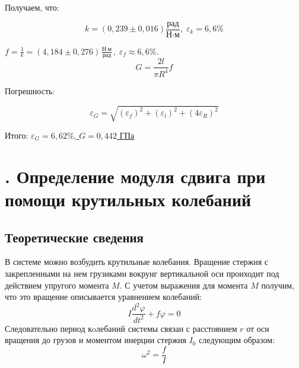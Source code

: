 \documentclass[a4paper, 12pt]{article}
\newcommand{\RomanNumeralCaps}[1]
    {\MakeUppercase{\romannumeral #1}}
\begin{document}
    \newpage

    \begin{center}
        
    Получаем, что:

    \bigskip
    
    \begin{equation}
        k = (0,239 \pm 0,016) \frac{\text{рад}}{\text{Н} \cdot \text{м}}, \;
        \varepsilon_{k} = 6,6 \%
    \end{equation}

    \bigskip

    $f = \frac{1}{k} = (4,184 \pm 0,276) \frac{\text{Н} \cdot \text{м}}{\text{рад}}, \; \varepsilon_{f} \approx 6,6\%$.
    \begin{equation}
        G=\frac{2l}{\pi R^{4}}f
    \end{equation}

    \bigskip
    
    Погрешность:

    \bigskip
    
    \begin{equation}    
    \varepsilon_{G} = \sqrt{(\varepsilon_{f})^2 + (\varepsilon_{l})^2 + (4\varepsilon_{R})^2}
    \end{equation}

    \bigskip
    
Итого: \underline{$\varepsilon_{G} = 6,62\%$, $G = 0,442$ ГПа}

\end{center}

\newpage

\section*{\RomanNumeralCaps{2}. Определение модуля сдвига при помощи крутильных колебаний}
    
\begin{center}
\subsection*{Теоретические сведения}
\end{center}

В системе можно возбудить крутильные колебания. Вращение стержня с закрепленными
на нем грузиками вокрунг вертикальной оси проиходит под действием упругого момента $M$.
С учетом выражения для момента $M$ получим, что это вращение описывается уравнением колебаний:
\begin{equation}
    I\frac{d^2 \varphi }{d t^2} + f \varphi =0
\end{equation}
Следовательно период кoлебаний системы связан с расстоянием $r$ от оси вращения до грузов и
моментом инерции стержня $I_0$ следующим образом:
\begin{equation}
    \omega^2 = \frac{f}{I}
\end{equation}
\end{document}
